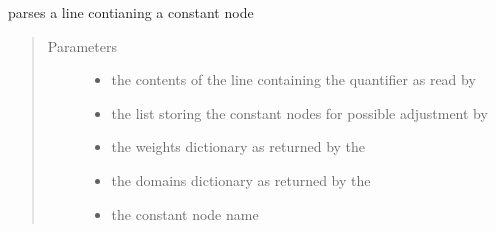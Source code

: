 \documentclass[letterpaper,10pt,english,openany,oneside]{sphinxmanual}
\begin{document}
\begin{fulllineitems}
\begin{fulllineitems}
\begin{quote}
\begin{description}
\end{description}\end{quote}

\end{fulllineitems}


\begin{fulllineitems}
\label{\detokenize{index:parser.Parser.parseConst}}
parses a line contianing a constant node
\begin{quote}\begin{description}
\item[{Parameters}] \leavevmode\begin{itemize}
\item {} 
 \textendash{} the contents of the line containing the quantifier as read by {\hyperref[\detokenize{index:parser.Parser.parseCircuit}]{}}

\item {} 
 \textendash{} the list storing the constant nodes for possible adjustment by {\hyperref[\detokenize{index:parser.Parser.adjustConstNodes}]{}}

\item {} 
 \textendash{} the weights dictionary as returned by the {\hyperref[\detokenize{index:parser.Parser.parseWeights}]{}}

\item {} 
 \textendash{} the domains dictionary as returned by the {\hyperref[\detokenize{index:parser.Parser.parseWeights}]{}}

\item {} 
 \textendash{} the constant node name

\end{itemize}


\end{description}
\end{quote}
\end{fulllineitems}
\end{fulllineitems}
\end{document}
